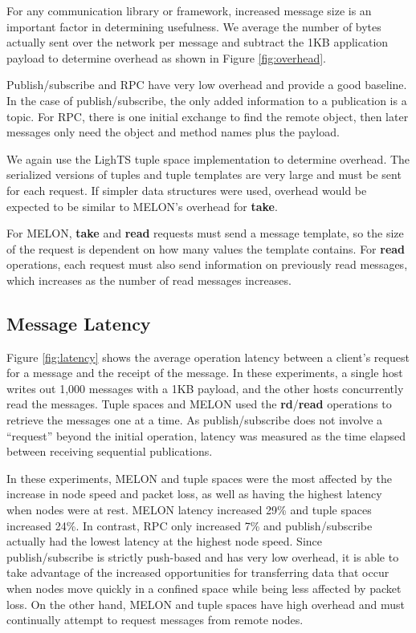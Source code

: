 \documentclass[lnicst]{svmultln}
\begin{document}
For any communication library or framework, increased message size is an important factor in determining usefulness. We average the number of bytes actually sent over the network per message and subtract the 1KB application payload to determine overhead as shown in Figure \ref{fig:overhead}.

Publish/subscribe and RPC have very low overhead and provide a good baseline. In the case of publish/subscribe, the only added information to a publication is a topic. For RPC, there is one initial exchange to find the remote object, then later messages only need the object and method names plus the payload.

We again use the LighTS tuple space implementation to determine overhead. The serialized versions of tuples and tuple templates are very large and must be sent for each request. If simpler data structures were used, overhead would be expected to be similar to MELON's overhead for \textbf{take}.

For MELON, \textbf{take} and \textbf{read} requests must send a message template, so the size of the request is dependent on how many values the template contains. For \textbf{read} operations, each request must also send information on previously read messages, which increases as the number of read messages increases.

\subsection{Message Latency}

Figure \ref{fig:latency} shows the average operation latency between a client's request for a message and the receipt of the message. In these experiments, a single host writes out 1,000 messages with a 1KB payload, and the other hosts concurrently read the messages. Tuple spaces and MELON used the \textbf{rd}/\textbf{read} operations to retrieve the messages one at a time. As publish/subscribe does not involve a ``request'' beyond the initial operation, latency was measured as the time elapsed between receiving sequential publications.

In these experiments, MELON and tuple spaces were the most affected by the increase in node speed and packet loss, as well as having the highest latency when nodes were at rest. MELON latency increased 29\% and tuple spaces increased 24\%. In contrast, RPC only increased 7\% and publish/subscribe actually had the lowest latency at the highest node speed. Since publish/subscribe is strictly push-based and has very low overhead, it is able to take advantage of the increased opportunities for transferring data that occur when nodes move quickly in a confined space while being less affected by packet loss. On the other hand, MELON and tuple spaces have high overhead and must continually attempt to request messages from remote nodes.
\end{document}
